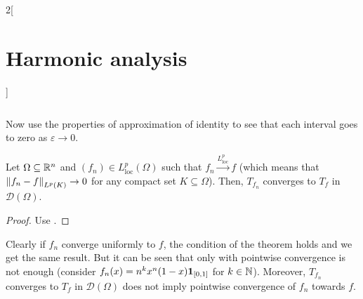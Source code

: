 \documentclass[../../../main_math.tex]{subfiles}
\begin{document}
\begin{multicols}{2}[\section{Harmonic analysis}]
\begin{sproof}
\begin{align*}
\begin{split}
      \end{split}
    \end{align*}
    Now use the properties of approximation of identity to see that each interval goes to zero as $\varepsilon\to 0$.
  \end{sproof}
  \begin{theorem}
    Let $\Omega\subseteq \mathbb{R}^n$ and $(f_n)\in L_\mathrm{loc}^p(\Omega)$ such that $f_n\overset{L_\mathrm{loc}^p}{\longrightarrow}f$ (which means that $\left\|f_n-f\right\|_{L^p(K)}\to 0$ for any compact set $K\subseteq \Omega$). Then, $T_{f_n}$ converges to $T_f$ in $\mathcal{D}(\Omega)$.
  \end{theorem}
  \begin{proof}
    Use .
  \end{proof}
  \begin{remark}
    Clearly if $f_n$ converge uniformly to $f$, the condition of the theorem holds and we get the same result. But it can be seen that only with pointwise convergence is not enough (consider $f_n(x)=n^kx^n(1-x)\boldsymbol{\mathrm{1}}_{[0,1]}$ for $k\in\mathbb{N}$). Moreover, $T_{f_n}$ converges to $T_f$ in $\mathcal{D}(\Omega)$ does not imply pointwise convergence of $f_n$ towards $f$.
  \end{remark}

\end{multicols}
\end{document}

